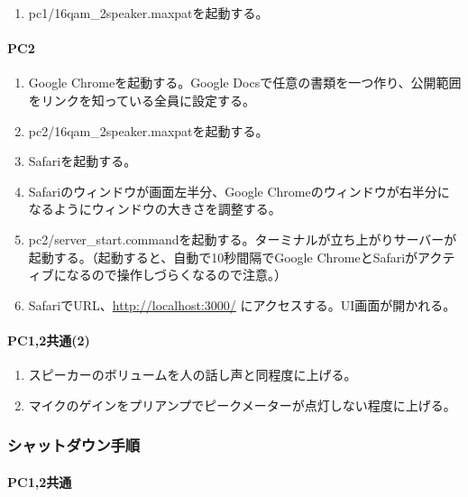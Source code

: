 \documentclass[a4paper]{jsarticle}
\begin{document}
\begin{enumerate}
\def\labelenumi{\arabic{enumi}.}
\tightlist
\item
  pc1/16qam\_2speaker.maxpatを起動する。
\end{enumerate}

\paragraph{PC2}\label{pc2}

\begin{enumerate}
\def\labelenumi{\arabic{enumi}.}
\tightlist
\item
  Google Chromeを起動する。Google
  Docsで任意の書類を一つ作り、公開範囲をリンクを知っている全員に設定する。
\item
  pc2/16qam\_2speaker.maxpatを起動する。
\item
  Safariを起動する。
\item
  Safariのウィンドウが画面左半分、Google
  Chromeのウィンドウが右半分になるようにウィンドウの大きさを調整する。
\item
  pc2/server\_start.commandを起動する。ターミナルが立ち上がりサーバーが起動する。（起動すると、自動で10秒間隔でGoogle
  ChromeとSafariがアクティブになるので操作しづらくなるので注意。）
\item
  SafariでURL、\url{http://localhost:3000/}
  にアクセスする。UI画面が開かれる。
\end{enumerate}

\paragraph{PC1,2共通(2)}\label{pc12ux5171ux901a2}

\begin{enumerate}
\def\labelenumi{\arabic{enumi}.}
\tightlist
\item
  スピーカーのボリュームを人の話し声と同程度に上げる。
\item
  マイクのゲインをプリアンプでピークメーターが点灯しない程度に上げる。
\end{enumerate}

\subsubsection{シャットダウン手順}\label{ux30b7ux30e3ux30c3ux30c8ux30c0ux30a6ux30f3ux624bux9806}

\paragraph{PC1,2共通}\label{pc12ux5171ux901a}
\end{document}
